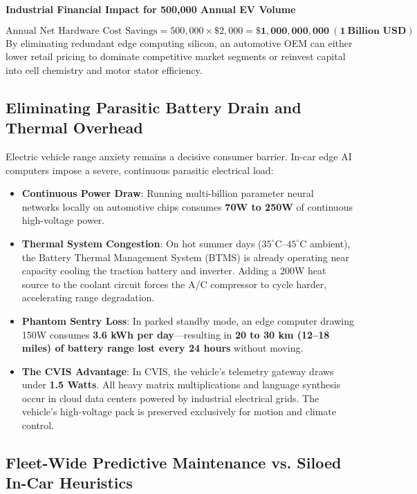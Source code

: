 \documentclass[12pt,a4paper]{report}
\newenvironment{ccnsbox}[1]{%
  \begin{mdframed}[backgroundcolor=cvislightbg,
    linecolor=cvisblue,linewidth=1.5pt,
    innerleftmargin=10pt,innerrightmargin=10pt,
    innertopmargin=6pt,innerbottommargin=6pt]
  \textbf{\color{cvisblue}#1}\par\smallskip}
  {\end{mdframed}}
\begin{document}
\begin{ccnsbox}{Industrial Financial Impact for 500,000 Annual EV Volume}
$$\text{Annual Net Hardware Cost Savings} = 500,000 \times \$2,000 = \mathbf{\$1,000,000,000\ (1\ \text{Billion USD})}$$
By eliminating redundant edge computing silicon, an automotive OEM can either lower retail pricing to dominate competitive market segments or reinvest capital into cell chemistry and motor stator efficiency.
\end{ccnsbox}

\subsection{Eliminating Parasitic Battery Drain and Thermal Overhead}

Electric vehicle range anxiety remains a decisive consumer barrier. In-car edge AI computers impose a severe, continuous parasitic electrical load:
\begin{itemize}[leftmargin=1.5cm]
  \item \textbf{Continuous Power Draw}: Running multi-billion parameter neural networks locally on automotive chips consumes \textbf{70W to 250W} of continuous high-voltage power.
  \item \textbf{Thermal System Congestion}: On hot summer days ($35^\circ\text{C}$--$45^\circ\text{C}$ ambient), the Battery Thermal Management System (BTMS) is already operating near capacity cooling the traction battery and inverter. Adding a 200W heat source to the coolant circuit forces the A/C compressor to cycle harder, accelerating range degradation.
  \item \textbf{Phantom Sentry Loss}: In parked standby mode, an edge computer drawing 150W consumes \textbf{3.6 kWh per day}---resulting in \textbf{20 to 30 km (12--18 miles) of battery range lost every 24 hours} without moving.
  \item \textbf{The CVIS Advantage}: In CVIS, the vehicle's telemetry gateway draws under \textbf{1.5 Watts}. All heavy matrix multiplications and language synthesis occur in cloud data centers powered by industrial electrical grids. The vehicle's high-voltage pack is preserved exclusively for motion and climate control.
\end{itemize}

\subsection{Fleet-Wide Predictive Maintenance vs. Siloed In-Car Heuristics}
\end{document}
